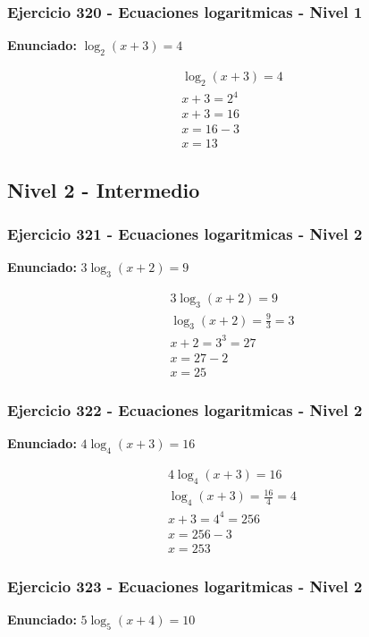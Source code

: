 \documentclass[12pt,a4paper]{article}
\begin{document}
\subsubsection*{Ejercicio 320 - Ecuaciones logaritmicas - Nivel 1}
\textbf{Enunciado:} \(\log_{2}\left(x+3\right)=4\)

\[
\begin{aligned}
\log_{2}\left(x+3\right)=4\\
x+3=2^{4}\\
x+3=16\\
x=16-3\\
\boxed{x=13}
\end{aligned}
\]


\newpage

\subsection*{Nivel 2 - Intermedio}

\subsubsection*{Ejercicio 321 - Ecuaciones logaritmicas - Nivel 2}
\textbf{Enunciado:} \(3\log_{3}\left(x+2\right)=9\)

\[
\begin{aligned}
3\log_{3}\left(x+2\right)=9\\
\log_{3}\left(x+2\right)=\frac{9}{3}=3\\
x+2=3^{3}=27\\
x=27-2\\
\boxed{x=25}
\end{aligned}
\]


\subsubsection*{Ejercicio 322 - Ecuaciones logaritmicas - Nivel 2}
\textbf{Enunciado:} \(4\log_{4}\left(x+3\right)=16\)

\[
\begin{aligned}
4\log_{4}\left(x+3\right)=16\\
\log_{4}\left(x+3\right)=\frac{16}{4}=4\\
x+3=4^{4}=256\\
x=256-3\\
\boxed{x=253}
\end{aligned}
\]


\subsubsection*{Ejercicio 323 - Ecuaciones logaritmicas - Nivel 2}
\textbf{Enunciado:} \(5\log_{5}\left(x+4\right)=10\)
\end{document}
